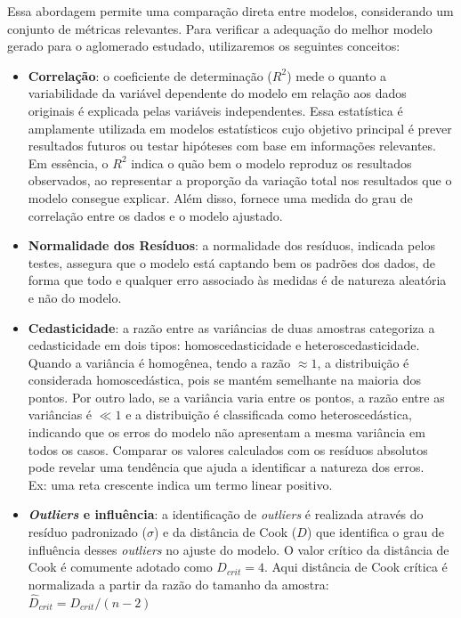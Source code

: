         Essa abordagem permite uma comparação direta entre modelos, considerando um conjunto de métricas relevantes. Para verificar a adequação do melhor modelo gerado para o aglomerado estudado, utilizaremos os seguintes conceitos:
        
        \begin{itemize}
            \item[(i)] \textbf{Correlação}: 
            o coeficiente de determinação (\(R^2\)) mede o quanto a variabilidade da variável dependente do modelo em relação aos dados originais é explicada pelas variáveis independentes. Essa estatística é amplamente utilizada em modelos estatísticos cujo objetivo principal é prever resultados futuros ou testar hipóteses com base em informações relevantes. Em essência, o \(R^2\) indica o quão bem o modelo reproduz os resultados observados, ao representar a proporção da variação total nos resultados que o modelo consegue explicar. Além disso, fornece uma medida do grau de correlação entre os dados e o modelo ajustado.
            
            \item[(ii)] \textbf{Normalidade dos Resíduos}:
            a normalidade dos resíduos, indicada pelos testes, assegura que o modelo está captando bem os padrões dos dados, de forma que todo e qualquer erro associado às medidas é de natureza aleatória e não do modelo.
            
            \item[(iii)] \textbf{Cedasticidade}: a razão entre as variâncias de duas amostras categoriza a cedasticidade em dois tipos: homoscedasticidade e heteroscedasticidade. Quando a variância é homogênea, tendo a razão \(\approx 1\), a distribuição é considerada homoscedástica, pois se mantém semelhante na maioria dos pontos. Por outro lado, se a variância varia entre os pontos, a razão entre as variâncias é \(\ll 1\) e a distribuição é classificada como heteroscedástica, indicando que os erros do modelo não apresentam a mesma variância em todos os casos. Comparar os valores calculados com os resíduos absolutos pode revelar uma tendência que ajuda a identificar a natureza dos erros. \\
            Ex: uma reta crescente indica um termo linear positivo.

            \item[(iv)] \textbf{\textit{Outliers} e influência}:
            a identificação de \textit{outliers} é realizada através do resíduo padronizado (\({\sigma}\)) e da distância de Cook (\(D\)) que identifica o grau de influência desses \textit{outliers} no ajuste do modelo. O valor crítico da distância de Cook é comumente adotado como \(D_{crit} = 4\).  Aqui distância de Cook crítica é normalizada a partir da razão do tamanho da amostra: \(\hat{D}_{crit} = D_{crit} / (n-2)\)
    
        \end{itemize}
        
